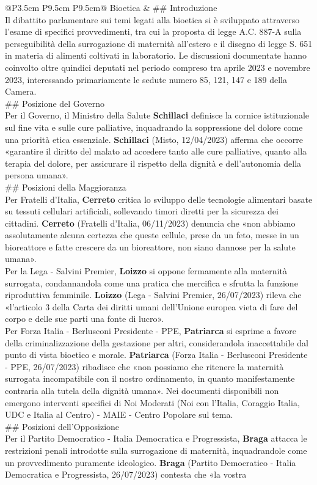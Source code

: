 \documentclass[a4paper,11pt]{article}
\begin{document}
\begin{landscape}
\begin{longtable}{@{}P{3.5cm} P{9.5cm} P{9.5cm}@{}}
\midrule
Bioetica & \#\# Introduzione\\[6pt] Il dibattito parlamentare sui temi legati alla bioetica si è sviluppato attraverso l'esame di specifici provvedimenti, tra cui la proposta di legge A.C. 887-A sulla perseguibilità della surrogazione di maternità all'estero e il disegno di legge S. 651 in materia di alimenti coltivati in laboratorio. Le discussioni documentate hanno coinvolto oltre quindici deputati nel periodo compreso tra aprile 2023 e novembre 2023, interessando primariamente le sedute numero 85, 121, 147 e 189 della Camera.\\[6pt] \#\# Posizione del Governo\\[6pt] Per il Governo, il Ministro della Salute \textbf{Schillaci} definisce la cornice istituzionale sul fine vita e sulle cure palliative, inquadrando la soppressione del dolore come una priorità etica essenziale. \textbf{Schillaci} (Misto, 12/04/2023) afferma che occorre «garantire il diritto del malato ad accedere tanto alle cure palliative, quanto alla terapia del dolore, per assicurare il rispetto della dignità e dell'autonomia della persona umana». \\[6pt] \#\# Posizioni della Maggioranza\\[6pt] Per Fratelli d'Italia, \textbf{Cerreto} critica lo sviluppo delle tecnologie alimentari basate su tessuti cellulari artificiali, sollevando timori diretti per la sicurezza dei cittadini. \textbf{Cerreto} (Fratelli d'Italia, 06/11/2023) denuncia che «non abbiamo assolutamente alcuna certezza che queste cellule, prese da un feto, messe in un bioreattore e fatte crescere da un bioreattore, non siano dannose per la salute umana».\\[6pt] Per la Lega - Salvini Premier, \textbf{Loizzo} si oppone fermamente alla maternità surrogata, condannandola come una pratica che mercifica e sfrutta la funzione riproduttiva femminile. \textbf{Loizzo} (Lega - Salvini Premier, 26/07/2023) rileva che «l'articolo 3 della Carta dei diritti umani dell'Unione europea vieta di fare del corpo e delle sue parti una fonte di lucro».\\[6pt] Per Forza Italia - Berlusconi Presidente - PPE, \textbf{Patriarca} si esprime a favore della criminalizzazione della gestazione per altri, considerandola inaccettabile dal punto di vista bioetico e morale. \textbf{Patriarca} (Forza Italia - Berlusconi Presidente - PPE, 26/07/2023) ribadisce che «non possiamo che ritenere la maternità surrogata incompatibile con il nostro ordinamento, in quanto manifestamente contraria alla tutela della dignità umana».  Nei documenti disponibili non emergono interventi specifici di Noi Moderati (Noi con l'Italia, Coraggio Italia, UDC e Italia al Centro) - MAIE - Centro Popolare sul tema. \\[6pt] \#\# Posizioni dell'Opposizione\\[6pt] Per il Partito Democratico - Italia Democratica e Progressista, \textbf{Braga} attacca le restrizioni penali introdotte sulla surrogazione di maternità, inquadrandole come un provvedimento puramente ideologico. \textbf{Braga} (Partito Democratico - Italia Democratica e Progressista, 26/07/2023) contesta che «la vostra 
\end{longtable}
\end{landscape}
\end{document}
